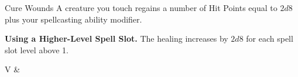 \begin{Spell}[
    level=1st,
    time=1 Action,
    range=Touch,
    components={V, S},
    duration=Instantaneous,
    school=Abjuration,
    attack=None,
    effect=Healing
  ]{Cure Wounds}
A creature you touch regains a number of Hit Points equal to $2d8$ plus your spellcasting ability modifier.

\textbf{Using a Higher-Level Spell Slot.} The healing increases by $2d8$ for each spell slot level above 1.

\begin{components}
V & 
\end{components}
\end{Spell}


